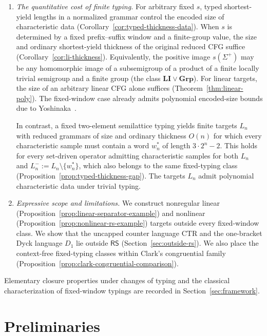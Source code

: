 \documentclass[11pt,a4paper]{article}
\theoremstyle{remark}
\theoremstyle{plain}
\begin{document}
\begin{enumerate}[label=\textup{(\arabic*)},leftmargin=2.4em]

\item \emph{The quantitative cost of finite typing.}
For arbitrary fixed $s$, typed shortest-yield lengths
in a normalized grammar control the encoded size of
characteristic data
(Corollary~\ref{cor:typed-thickness-data}).
When $s$ is determined by a fixed prefix--suffix window
and a finite-group value, the size and ordinary shortest-yield
thickness of the original reduced CFG suffice
(Corollary~\ref{cor:li-thickness}).
Equivalently, the positive image $s(\Sigma^+)$ may be any
homomorphic image of a subsemigroup of a product of a
finite locally trivial semigroup and a finite group
(the class $\mathbf{LI}\vee\mathbf{Grp}$).
For linear targets, the size of an arbitrary linear CFG
alone suffices (Theorem~\ref{thm:linear-poly}).
The fixed-window case already admits polynomial
encoded-size bounds due to
Yoshinaka~\cite[Theorem~1]{yoshinaka2008}.

In contrast, a fixed two-element semilattice typing yields
finite targets $L_n$ with reduced grammars of size and
ordinary thickness $O(n)$ for which every characteristic
sample must contain a word $w_n^*$ of length $3\cdot2^n-2$.
This holds for every set-driven operator admitting
characteristic samples for both $L_n$ and
$L_n^-:=L_n\setminus\{w_n^*\}$, which also belongs
to the same fixed-typing class
(Proposition~\ref{prop:typed-thickness-gap}).
The targets $L_n$ admit polynomial characteristic data
under trivial typing.

\item \emph{Expressive scope and limitations.}
We construct nonregular linear
(Proposition~\ref{prop:linear-separator-example})
and nonlinear
(Proposition~\ref{prop:nonlinear-rs-example})
targets outside every fixed-window class.
We show that the uncapped counter language
$\mathrm{CTR}$ and the one-bracket Dyck language
$D_1$ lie outside $\mathsf{RS}$
(Section~\ref{sec:outside-rs}).
We also place the context-free fixed-typing classes
within Clark's congruential family
(Proposition~\ref{prop:clark-congruential-comparison}).

\end{enumerate}

Elementary closure properties under changes of typing
and the classical characterization of fixed-window
typings are recorded in Section~\ref{sec:framework}.

\section{Preliminaries}
\label{sec:prelim}
\end{document}
